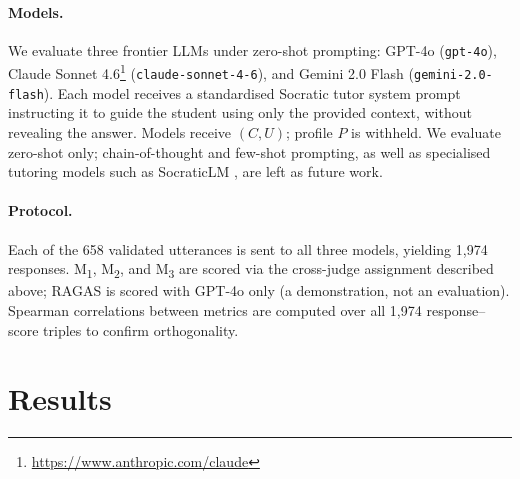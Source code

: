 \documentclass[11pt]{article}
\newcommand{\mtwo}{M\textsubscript{2}\xspace}
\newcommand{\mone}{M\textsubscript{1}\xspace}
\newcommand{\mthree}{M\textsubscript{3}\xspace}
\begin{document}
\paragraph{Models.}
We evaluate three frontier LLMs under zero-shot prompting:
GPT-4o \citep{openai2023gpt4} (\texttt{gpt-4o}),
Claude Sonnet 4.6\footnote{\url{https://www.anthropic.com/claude}} (\texttt{claude-sonnet-4-6}), and
Gemini 2.0 Flash \citep{geminiteam2024gemini} (\texttt{gemini-2.0-flash}).
Each model receives a standardised Socratic tutor system prompt instructing
it to guide the student using only the provided context, without revealing
the answer.
Models receive $(C, U)$; profile $P$ is withheld.
We evaluate zero-shot only; chain-of-thought and few-shot prompting, as well
as specialised tutoring models such as SocraticLM
\citep{liuj2024socraticlm}, are left as future work.

\paragraph{Protocol.}
Each of the 658 validated utterances is sent to all three models, yielding
1{,}974 responses.
\mone, \mtwo, and \mthree are scored via the cross-judge assignment
described above; RAGAS is scored with GPT-4o only (a demonstration, not an
evaluation).
Spearman correlations between metrics are computed over all 1{,}974
response--score triples to confirm orthogonality.

\section{Results}
\label{sec:results}
\end{document}
